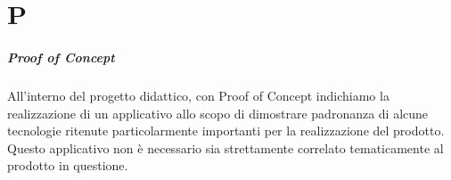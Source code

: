 \chapter{P}
\paragraph{Proof of Concept}
All'interno del progetto didattico, con Proof of Concept indichiamo la realizzazione di un applicativo allo scopo di dimostrare padronanza di alcune tecnologie ritenute particolarmente importanti per la realizzazione del prodotto. Questo applicativo non è necessario sia strettamente correlato tematicamente al prodotto in questione.